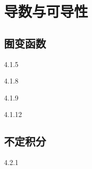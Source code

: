    
\begin{solution}

\end{solution}


    
\section{导数与可导性}

\subsection{囿变函数}
  {4.1.5}

   
\begin{solution}

\end{solution}



  {4.1.8}

   
\begin{solution}

\end{solution}



  {4.1.9}

   
\begin{solution}

\end{solution}



  {4.1.12}

   
\begin{solution}

\end{solution}


\subsection{不定积分}
  {4.2.1}

   
\begin{solution}

\end{solution}

